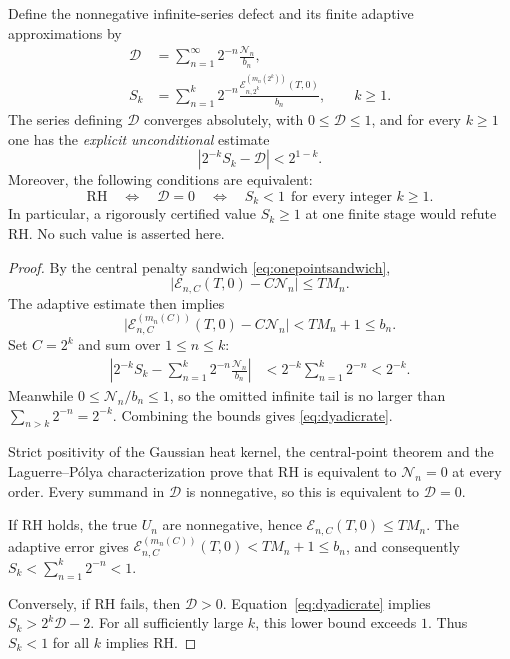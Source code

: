 \begin{theorem}
\label{thm:dyadicdefect}
Define the nonnegative infinite-series defect
and its finite adaptive approximations by
\begin{align}
\mathscr D&=\sum_{n=1}^\infty
2^{-n}\frac{\mathcal N_n}{b_n},
\label{eq:defectD}\\
S_k&=\sum_{n=1}^k2^{-n}
\frac{\mathcal E_{n,2^k}^{(m_n(2^k))}(T,0)}{b_n},
\qquad k\ge1.
\label{eq:defectSk}
\end{align}
The series defining $\mathscr D$ converges absolutely,
with $0\le\mathscr D\le1$, and for every $k\ge1$
one has the \emph{explicit unconditional} estimate
\begin{equation}
\boxed{\left|2^{-k}S_k-\mathscr D\right|
<2^{1-k}.}
\label{eq:dyadicrate}
\end{equation}
Moreover, the following conditions are equivalent:
\begin{equation}
\boxed{
\mathrm{RH}\quad\Longleftrightarrow\quad
\mathscr D=0\quad\Longleftrightarrow\quad
S_k<1\ \ \text{for every integer }k\ge1.
}
\label{eq:dyadicRH}
\end{equation}
In particular, a rigorously certified value $S_k\ge1$
at one finite stage would refute RH.
No such value is asserted here.
\end{theorem}
\begin{proof}
By the central penalty sandwich
\eqref{eq:onepointsandwich},
\[
\big|\mathcal E_{n,C}(T,0)-C\mathcal N_n\big|
\le TM_n.
\]
The adaptive estimate then implies
\[
\big|\mathcal E_{n,C}^{(m_n(C))}(T,0)
-C\mathcal N_n\big|<TM_n+1\le b_n.
\]
Set $C=2^k$ and sum over $1\le n\le k$:
\begin{align*}
\left|2^{-k}S_k-
\sum_{n=1}^k2^{-n}\frac{\mathcal N_n}{b_n}\right|
&<2^{-k}\sum_{n=1}^k2^{-n}
<2^{-k}.
\end{align*}
Meanwhile $0\le\mathcal N_n/b_n\le1$, so
the omitted infinite tail is no larger than
$\sum_{n>k}2^{-n}=2^{-k}$.
Combining the bounds gives
\eqref{eq:dyadicrate}.

Strict positivity of the Gaussian heat kernel,
the central-point theorem and the
Laguerre--P\'olya characterization prove that
RH is equivalent to $\mathcal N_n=0$ at every
order. Every summand in $\mathscr D$ is
nonnegative, so this is equivalent to
$\mathscr D=0$.

If RH holds, the true $U_n$ are nonnegative,
hence $\mathcal E_{n,C}(T,0)\le TM_n$.
The adaptive error gives
$\mathcal E_{n,C}^{(m_n(C))}(T,0)
<TM_n+1\le b_n$,
and consequently
$S_k<\sum_{n=1}^k2^{-n}<1$.

Conversely, if RH fails, then $\mathscr D>0$.
Equation~\eqref{eq:dyadicrate} implies
$S_k>2^k\mathscr D-2$.
For all sufficiently large $k$,
this lower bound exceeds $1$.
Thus $S_k<1$ for all $k$ implies RH.
\end{proof}

